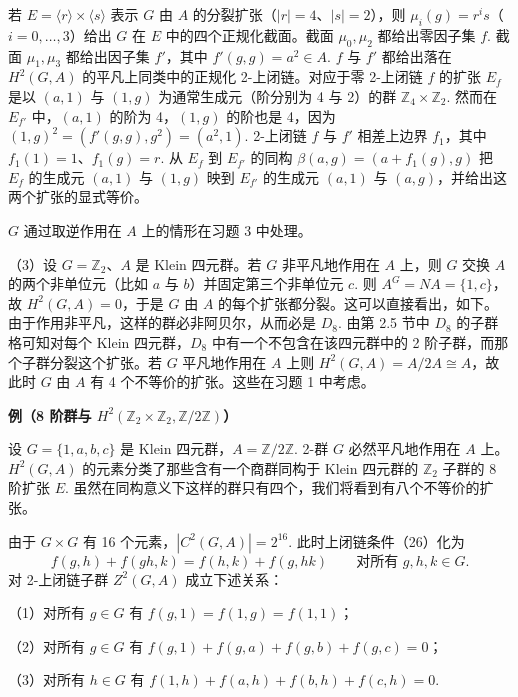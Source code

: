 若 \(E = \langle r\rangle \times \langle s\rangle\) 表示 \(G\) 由 \(A\) 的分裂扩张（\(|r| = 4\)、\(|s| = 2\)），则 \(\mu_i(g) = r^is\)（\(i = 0, \ldots, 3\)）给出 \(G\) 在 \(E\) 中的四个正规化截面。截面 \(\mu_0, \mu_2\) 都给出零因子集 \(f\). 截面 \(\mu_1, \mu_3\) 都给出因子集 \(f'\)，其中 \(f'(g,g) = a^2 \in A\). \(f\) 与 \(f'\) 都给出落在 \(H^2(G, A)\) 的平凡上同类中的正规化 2-上闭链。对应于零 2-上闭链 \(f\) 的扩张 \(E_f\) 是以 \((a,1)\) 与 \((1,g)\) 为通常生成元（阶分别为 4 与 2）的群 \(\mathbb{Z}_4 \times \mathbb{Z}_2\). 然而在 \(E_{f'}\) 中，\((a,1)\) 的阶为 4，\((1,g)\) 的阶也是 4，因为 \((1,g)^2 = (f'(g,g), g^2) = (a^2, 1)\). 2-上闭链 \(f\) 与 \(f'\) 相差上边界 \(f_1\)，其中 \(f_1(1) = 1\)、\(f_1(g) = r\). 从 \(E_f\) 到 \(E_{f'}\) 的同构 \(\beta(a,g) = (a+f_1(g), g)\) 把 \(E_f\) 的生成元 \((a,1)\) 与 \((1,g)\) 映到 \(E_{f'}\) 的生成元 \((a,1)\) 与 \((a,g)\)，并给出这两个扩张的显式等价。

\(G\) 通过取逆作用在 \(A\) 上的情形在习题 3 中处理。

（3）设 \(G = \mathbb{Z}_2\)、\(A\) 是 Klein 四元群。若 \(G\) 非平凡地作用在 \(A\) 上，则 \(G\) 交换 \(A\) 的两个非单位元（比如 \(a\) 与 \(b\)）并固定第三个非单位元 \(c\). 则 \(A^G = NA = \{1, c\}\)，故 \(H^2(G, A) = 0\)，于是 \(G\) 由 \(A\) 的每个扩张都分裂。这可以直接看出，如下。由于作用非平凡，这样的群必非阿贝尔，从而必是 \(D_8\). 由第 2.5 节中 \(D_8\) 的子群格可知对每个 Klein 四元群，\(D_8\) 中有一个不包含在该四元群中的 2 阶子群，而那个子群分裂这个扩张。若 \(G\) 平凡地作用在 \(A\) 上则 \(H^2(G, A) = A/2A \cong A\)，故此时 \(G\) 由 \(A\) 有 4 个不等价的扩张。这些在习题 1 中考虑。

\noindent\textbf{例（8 阶群与 \(H^2(\mathbb{Z}_2 \times \mathbb{Z}_2, \mathbb{Z}/2\mathbb{Z})\)）}

设 \(G = \{1, a, b, c\}\) 是 Klein 四元群，\(A = \mathbb{Z}/2\mathbb{Z}\). 2-群 \(G\) 必然平凡地作用在 \(A\) 上。\(H^2(G, A)\) 的元素分类了那些含有一个商群同构于 Klein 四元群的 \(\mathbb{Z}_2\) 子群的 8 阶扩张 \(E\). 虽然在同构意义下这样的群只有四个，我们将看到有八个不等价的扩张。

由于 \(G \times G\) 有 16 个元素，\(|C^2(G, A)| = 2^{16}\). 此时上闭链条件（26）化为
\[
f(g,h)+f(gh,k) = f(h,k)+f(g,hk) \qquad \text{对所有 } g, h, k \in G. \tag{17.38}
\]
对 2-上闭链子群 \(Z^2(G, A)\) 成立下述关系：

（1）对所有 \(g \in G\) 有 \(f(g,1) = f(1,g) = f(1,1)\)；

（2）对所有 \(g \in G\) 有 \(f(g,1)+f(g,a)+f(g,b)+f(g,c) = 0\)；

（3）对所有 \(h \in G\) 有 \(f(1,h)+f(a,h)+f(b,h)+f(c,h) = 0\).

